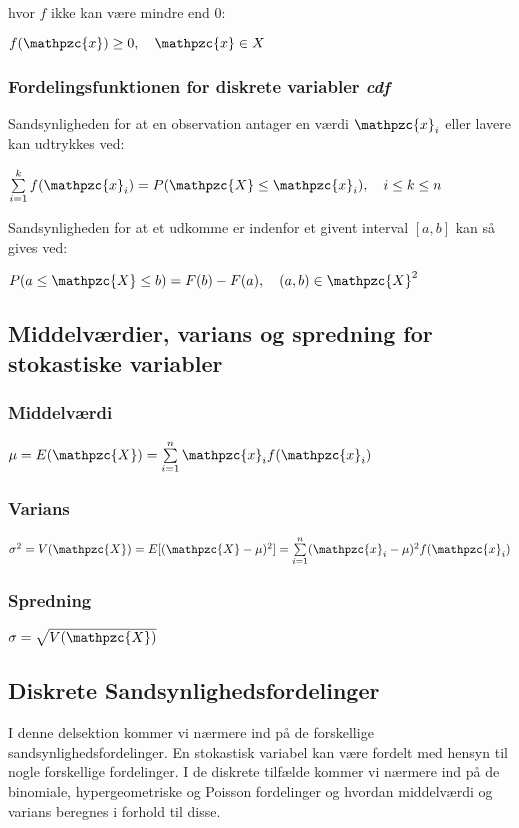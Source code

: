 \documentclass{article}
\newcommand{\mellemrum}{\vspace{2 ex}}
\newcommand{\cent}[1]{ \mellemrum \begin{center} #1\end{center} \mellemrum }
\newcommand{\summation}[2]{\sum\limits_{#1}^{#2}}
\newcommand{\script}[1]{\mathpzc{#1}}
\begin{document}
	hvor $f$ ikke kan være mindre end 0:
	
	\cent{$ f(\script{x}) \geq 0, \quad \script{x} \in X$}
	
	\subsubsection{Fordelingsfunktionen for diskrete variabler \textit{cdf}}
	
	Sandsynligheden for at en observation antager en værdi $\script{x}_i$ eller lavere kan udtrykkes ved:
	
	\cent{$ \summation{i = 1}{k} f(\script{x}_i) = P(\script{X} \leq \script{x}_i), \quad i \leq k \leq n $}
	
	Sandsynligheden for at et udkomme er indenfor et givent interval $[a,b]$ kan så gives ved:
	
	
	\cent{$ P(a \leq \script{X} \leq b) = F(b) - F(a), \quad (a,b)\in \script{X}^2 $}
	
	\subsection{Middelværdier, varians og spredning for stokastiske variabler}
	\subsubsection{Middelværdi}
	
	\cent{$ \mu = E(\script{X}) = \summation{i=1}{n} \script{x}_i f(\script{x}_i) $}
	
	\subsubsection{Varians}
	
	\cent{$ \sigma^2 = V(\script{X}) = E[(\script{X} - \mu)^2] = \summation{i=1}{n} (\script{x}_i - \mu)^2 f(\script{x}_i) $}
	
	\subsubsection{Spredning}
	
	\cent{$ \sigma = \sqrt{V(\script{X})} $}
	
	\subsection{Diskrete Sandsynlighedsfordelinger}
	
	I denne delsektion kommer vi nærmere ind på de forskellige sandsynlighedsfordelinger. En stokastisk variabel kan være fordelt med hensyn til nogle forskellige fordelinger. I de diskrete tilfælde kommer vi nærmere ind på de binomiale, hypergeometriske og Poisson fordelinger og hvordan middelværdi og varians beregnes i forhold til disse. 
	
\end{document}
